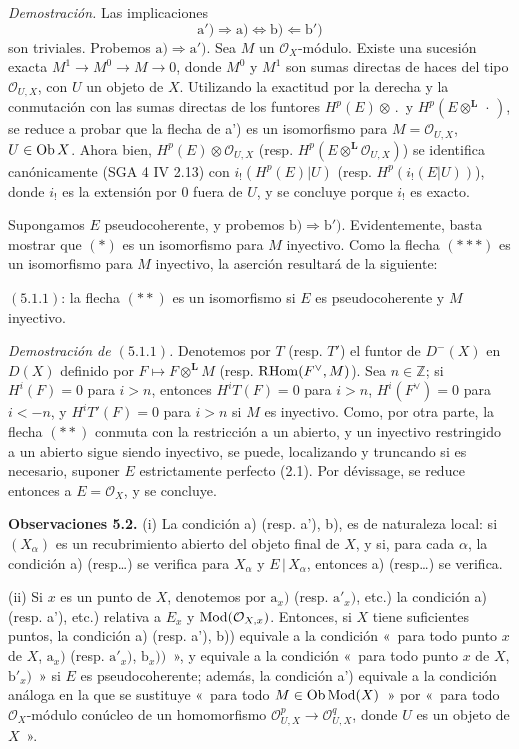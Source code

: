 \emph{Demostración.} Las implicaciones
\[
 \mathrm a')\Longrightarrow\mathrm a)\Longleftrightarrow\mathrm b)\Longleftarrow\mathrm b')
\]
son triviales. Probemos \(\mathrm a)\Longrightarrow\mathrm a')\). Sea \(M\) un \(\mathcal O_X\)-módulo. Existe una sucesión exacta \(M^1\longrightarrow M^0\longrightarrow M\longrightarrow0\), donde \(M^0\) y \(M^1\) son sumas directas de haces del tipo \(\mathcal O_{U,X}\), con \(U\) un objeto de \(X\). Utilizando la exactitud por la derecha y la conmutación con las sumas directas de los funtores \(H^p(E)\otimes\,.\,\) y \(H^p(E\otimes^{\mathbf L}\,\cdot\,)\), se reduce a probar que la flecha de a') es un isomorfismo para \(M=\mathcal O_{U,X}\), \(U\in\operatorname{Ob} X\). Ahora bien, \(H^p(E)\otimes\mathcal O_{U,X}\) (resp. \(H^p(E\otimes^{\mathbf L}\mathcal O_{U,X})\)) se identifica canónicamente (SGA 4 IV 2.13) con \(i_!(H^p(E)|U)\) (resp. \(H^p(i_!(E|U))\)), donde \(i_!\) es la extensión por \(0\) fuera de \(U\), y se concluye porque \(i_!\) es exacto.

Supongamos \(E\) pseudocoherente, y probemos \(\mathrm b)\Longrightarrow\mathrm b')\). Evidentemente, basta mostrar que \((*)\) es un isomorfismo para \(M\) inyectivo. Como la flecha \((***)\) es un isomorfismo para \(M\) inyectivo, la aserción resultará de la siguiente:

\((5.1.1)\): la flecha \((**)\) es un isomorfismo si \(E\) es pseudocoherente y \(M\) inyectivo.

\emph{Demostración de \((5.1.1)\).} Denotemos por \(T\) (resp. \(T'\)) el funtor de \(D^-(X)\) en \(D(X)\) definido por \(F\mapsto F\otimes^{\mathbf L}M\) (resp. \(\mathrm R\!\operatorname{Hom}(F^{\vee},M)\)). Sea \(n\in\mathbb Z\); si \(H^i(F)=0\) para \(i>n\), entonces \(H^iT(F)=0\) para \(i>n\), \(H^i(F^{\vee})=0\) para \(i<-n\), y \(H^iT'(F)=0\) para \(i>n\) si \(M\) es inyectivo. Como, por otra parte, la flecha \((**)\) conmuta con la restricción a un abierto, y un inyectivo restringido a un abierto sigue siendo inyectivo, se puede, localizando y truncando si es necesario, suponer \(E\) estrictamente perfecto (2.1). Por dévissage, se reduce entonces a \(E=\mathcal O_X\), y se concluye.

\textbf{Observaciones 5.2.} (i) La condición a) (resp. a'), b),  es de naturaleza local: si \((X_\alpha)\) es un recubrimiento abierto del objeto final de \(X\), y si, para cada \(\alpha\), la condición a) (resp\ldots) se verifica para \(X_\alpha\) y \(E\,|\,X_\alpha\), entonces a) (resp\ldots) se verifica.

(ii) Si \(x\) es un punto de \(X\), denotemos por \(\mathrm a_x)\) (resp. \(\mathrm a'_x)\), etc.) la condición a) (resp. a'), etc.) relativa a \(E_x\) y \(\operatorname{Mod}(\mathcal O_{X,x})\). Entonces, si \(X\) tiene suficientes puntos, la condición a) (resp. a'), b)) equivale a la condición «~para todo punto \(x\) de \(X\), \(\mathrm a_x)\) (resp. \(\mathrm a'_x)\), \(\mathrm b_x))\)~», y equivale a la condición «~para todo punto \(x\) de \(X\), \(\mathrm b'_x)\)~» si \(E\) es pseudocoherente; además, la condición a') equivale a la condición análoga en la que se sustituye «~para todo \(M\in\operatorname{Ob}\operatorname{Mod}(X)\)~» por «~para todo \(\mathcal O_X\)-módulo conúcleo de un homomorfismo \(\mathcal O_{U,X}^p\longrightarrow\mathcal O_{U,X}^q\), donde \(U\) es un objeto de \(X\)~».

